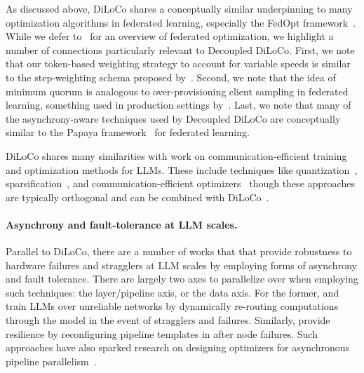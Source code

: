 \documentclass[11pt, a4paper, twocolumn, copyright, google]{google}
\begin{document}
As discussed above, DiLoCo shares a conceptually similar underpinning to many optimization algorithms in federated learning, especially the FedOpt framework~\citep{reddi2021adaptive}. While we defer to~\citep{wang2021field} for an overview of federated optimization, we highlight a number of connections particularly relevant to Decoupled DiLoCo. First, we note that our token-based weighting strategy to account for variable speeds is similar to the step-weighting schema proposed by~\citet{wang2020tackling}. Second, we note that the idea of minimum quorum is analogous to over-provisioning client sampling in federated learning, something used in production settings by~\citet{bonawitz2019towards}. Last, we note that many of the asynchrony-aware techniques used by Decoupled DiLoCo are conceptually similar to the Papaya framework~\citep{huba2022papaya} for federated learning.

DiLoCo shares many similarities with work on communication-efficient training and optimization methods for LLMs. These include techniques like quantization~\citep{alistarh2017qsgd}, sparsification~\citep{wang2023cocktailsgd}, and communication-efficient optimizers~\citep{ahn2025dion,jovanovic2026lordo} though these approaches are typically orthogonal and can be combined with DiLoCo~\citep{douillard2025streaming}.

\paragraph{Asynchrony and fault-tolerance at LLM scales.} Parallel to DiLoCo, there are a number of works that that provide robustness to hardware failures and stragglers at LLM scales by employing forms of asynchrony and fault tolerance. There are largely two axes to parallelize over when employing such techniques: the layer/pipeline axis, or the data axis. For the former, \citet{borzunov2023distributed} and \citet{ryabinin2023swarm} train LLMs over unreliable networks by dynamically re-routing computations through the model in the event of stragglers and failures. Similarly, \citet{jang2023oobleck} provide resilience by reconfiguring pipeline templates in after node failures. Such approaches have also sparked research on designing optimizers for asynchronous pipeline parallelism~\citep{ajanthan2025momentum}.
\end{document}
